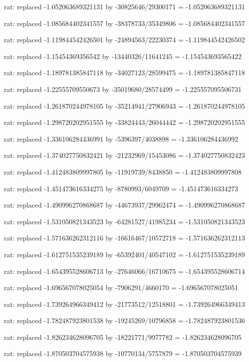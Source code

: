 \documentclass[a4paper,10pt]{article}
\begin{document}
\begin{eulernotebook}
\begin{eulercomment}
\begin{eulercomment}
\begin{eulercomment}
\begin{eulercomment}
\begin{eulercomment}
\begin{eulercomment}
\begin{eulercomment}
\begin{eulercomment}
\begin{eulercomment}
\begin{eulercomment}
\begin{eulercomment}
\begin{eulercomment}
\begin{eulercomment}
\begin{eulercomment}
\begin{eulercomment}
\begin{eulercomment}
\begin{euleroutput}
  rat: replaced -1.052063689321131 by -30825646/29300171 = -1.052063689321131
  
  rat: replaced -1.085684402341557 by -38378733/35349806 = -1.085684402341557
  
  rat: replaced -1.119844542426501 by -24894563/22230374 = -1.119844542426502
  
  rat: replaced -1.15454369356542 by -13440326/11641245 = -1.154543693565422
  
  rat: replaced -1.189781385847118 by -34027123/28599475 = -1.189781385847118
  
  rat: replaced -1.22555709550673 by -35019680/28574499 = -1.225557095506731
  
  rat: replaced -1.261870244978105 by -35214941/27906943 = -1.261870244978105
  
  rat: replaced -1.298720202951555 by -33824443/26044442 = -1.298720202951555
  
  rat: replaced -1.336106284436991 by -5396397/4038898 = -1.336106284436992
  
  rat: replaced -1.374027750832421 by -21232969/15453086 = -1.374027750832423
  
  rat: replaced -1.412483809997805 by -11919739/8438850 = -1.412483809997808
  
  rat: replaced -1.451473616334275 by -8780993/6049709 = -1.451473616334273
  
  rat: replaced -1.490996270868687 by -44673937/29962474 = -1.490996270868687
  
  rat: replaced -1.531050821343523 by -64281527/41985234 = -1.531050821343523
  
  rat: replaced -1.571636262312116 by -16616467/10572718 = -1.571636262312113
  
  rat: replaced -1.612751535239189 by -65392401/40547102 = -1.612751535239189
  
  rat: replaced -1.654395528606713 by -27646066/16710675 = -1.654395528606714
  
  rat: replaced -1.696567078025054 by -7906291/4660170 = -1.696567078025051
  
  rat: replaced -1.739264966349412 by -21773512/12518801 = -1.739264966349413
  
  rat: replaced -1.782487923801538 by -19245269/10796858 = -1.782487923801536
  
  rat: replaced -1.826234628096705 by -18221771/9977782 = -1.826234628096705
  
  rat: replaced -1.870503704575938 by -10770134/5757879 = -1.870503704575939
  

\end{euleroutput}
\end{eulercomment}
\end{eulercomment}
\end{eulercomment}
\end{eulercomment}
\end{eulercomment}
\end{eulercomment}
\end{eulercomment}
\end{eulercomment}
\end{eulercomment}
\end{eulercomment}
\end{eulercomment}
\end{eulercomment}
\end{eulercomment}
\end{eulercomment}
\end{eulercomment}
\end{eulercomment}
\end{eulernotebook}
\end{document}
